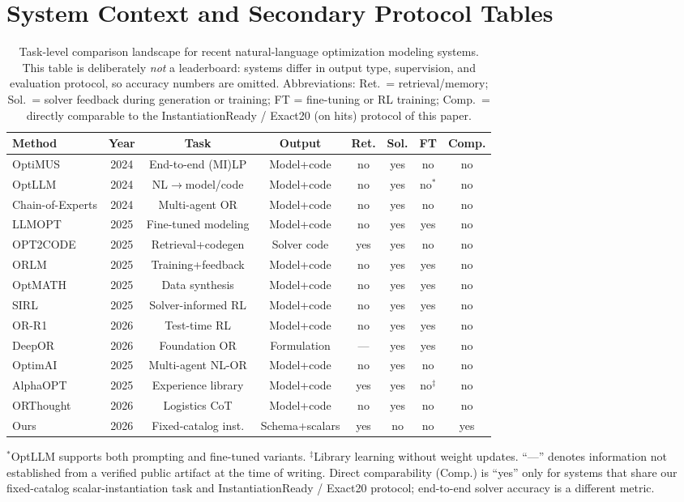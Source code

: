 \documentclass[pdflatex,sn-basic,Numbered]{sn-jnl}
\begin{document}
\section{System Context and Secondary Protocol Tables}
\begin{table}[htbp]
\centering
\caption{Task-level comparison landscape for recent natural-language optimization modeling systems.
This table is deliberately \emph{not} a leaderboard: systems differ in output type, supervision, and
evaluation protocol, so accuracy numbers are omitted. Abbreviations: Ret.\ = retrieval/memory;
Sol.\ = solver feedback during generation or training; FT = fine-tuning or RL training;
Comp.\ = directly comparable
to the InstantiationReady / Exact20 (on hits) protocol of this paper.}
\label{tab:comparison_landscape}
\scriptsize
\setlength{\tabcolsep}{2.4pt}
\renewcommand{\arraystretch}{1.12}
\begin{tabular}{@{}lccccccc@{}}
\toprule
Method & Year & Task & Output & Ret. & Sol. & FT & Comp. \\
\midrule
OptiMUS & 2024 & End-to-end (MI)LP & Model+code & no & yes & no & no \\
OptLLM & 2024 & NL$\rightarrow$model/code & Model+code & no & yes & no$^{*}$ & no \\
Chain-of-Experts & 2024 & Multi-agent OR & Model+code & no & yes & no & no \\
LLMOPT & 2025 & Fine-tuned modeling & Model+code & no & yes & yes & no \\
OPT2CODE & 2025 & Retrieval+codegen & Solver code & yes & yes & no & no \\
ORLM & 2025 & Training+feedback & Model+code & no & yes & yes & no \\
OptMATH & 2025 & Data synthesis & Model+code & no & yes & yes & no \\
SIRL & 2025 & Solver-informed RL & Model+code & no & yes & yes & no \\
OR-R1 & 2026 & Test-time RL & Model+code & no & yes & yes & no \\
DeepOR & 2026 & Foundation OR & Formulation & --- & yes & yes & no \\
OptimAI & 2025 & Multi-agent NL-OR & Model+code & no & yes & no & no \\
AlphaOPT & 2025 & Experience library & Model+code & yes & yes & no$^{\ddagger}$ & no \\
ORThought & 2026 & Logistics CoT & Model+code & no & yes & no & no \\
Ours & 2026 & Fixed-catalog inst. & Schema+scalars & yes & no & no & yes \\
\bottomrule
\end{tabular}

\vspace{1mm}
\raggedright
\footnotesize
$^{*}$OptLLM supports both prompting and fine-tuned variants.
$^{\ddagger}$Library learning without weight updates.
``---'' denotes information not established from a verified public artifact at the time of writing.
Direct comparability (Comp.) is ``yes'' only for systems that share our fixed-catalog scalar-instantiation
task and InstantiationReady / Exact20 protocol; end-to-end solver accuracy is a different metric.
\end{table}
\end{document}
